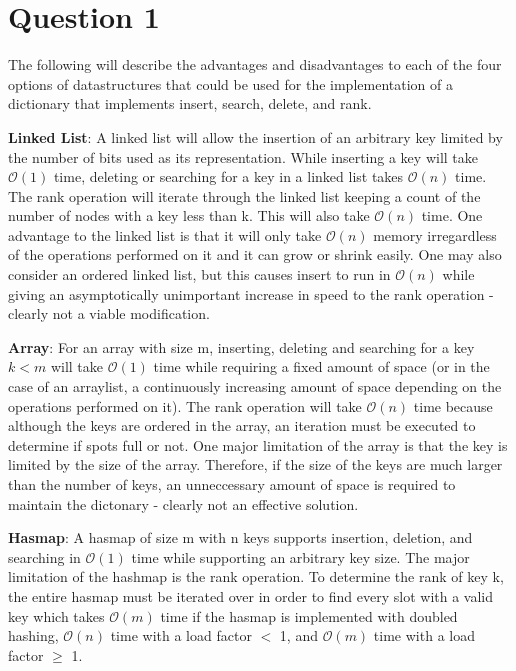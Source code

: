 \section{Question 1}
The following will describe the advantages and disadvantages to each of the four options of datastructures that could be used for the implementation of a dictionary that implements insert, search, delete, and rank.

\textbf{Linked List}:
A linked list will allow the insertion of an arbitrary key limited by the number of bits used as its representation. While inserting a key will take $\mathcal{O}(1)$ time, deleting or searching for a key in a linked list takes $\mathcal{O}(n)$ time. The rank operation will iterate through the linked list keeping a count of the number of nodes with a key less than k. This will also take $\mathcal{O}(n)$ time. One advantage to the linked list is that it will only take $\mathcal{O}(n)$ memory irregardless of the operations performed on it and it can grow or shrink easily. One may also consider an ordered linked list, but this causes insert to run in $\mathcal{O}(n)$ while giving an asymptotically unimportant increase in speed to the rank operation - clearly not a viable modification.

\textbf{Array}:
For an array with size m, inserting, deleting and searching for a key $k < m$ will take $\mathcal{O}(1)$ time while requiring a fixed amount of space (or in the case of an arraylist, a continuously increasing amount of space depending on the operations performed on it). The rank operation will take $\mathcal{O}(n)$ time because although the keys are ordered in the array, an iteration must be executed to determine if spots full or not. One major limitation of the array is that the key is limited by the size of the array. Therefore, if the size of the keys are much larger than the number of keys, an unneccessary amount of space is required to maintain the dictonary - clearly not an effective solution.

\textbf{Hasmap}:
A hasmap of size m with n keys supports insertion, deletion, and searching in $\mathcal{O}(1)$ time while supporting an arbitrary key size. The major limitation of the hashmap is the rank operation. To determine the rank of key k, the entire hasmap must be iterated over in order to find every slot with a valid key which takes $\mathcal{O}(m)$ time if the hasmap is implemented with doubled hashing, $\mathcal{O}(n)$ time with a load factor $<$ 1, and $\mathcal{O}(m)$ time with a load factor $\geq$ 1.

